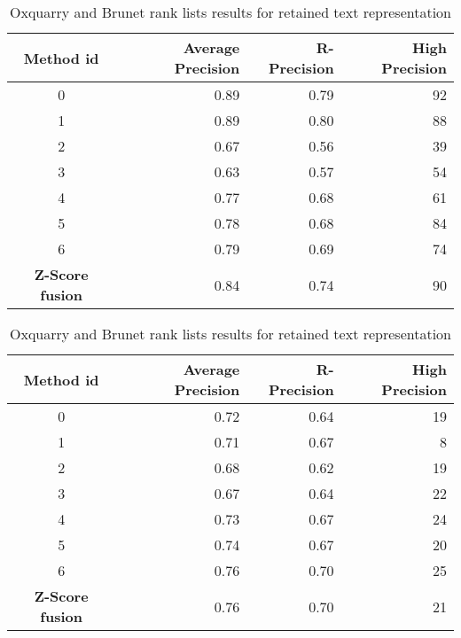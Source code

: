 \begin{table}[H]
  \centering
  \caption{Oxquarry and Brunet rank lists results for retained text representation}
  \label{tab:9rl_results_brunet_oxquarry}

  \begin{tabular}{c r r r}
    \toprule
    Method id &
    Average Precision &
    R-Precision &
    High Precision \\
    \midrule
    0 & 0.89 & 0.79 & 92 \\
    1 & 0.89 & 0.80 & 88 \\
    2 & 0.67 & 0.56 & 39 \\
    3 & 0.63 & 0.57 & 54 \\
    4 & 0.77 & 0.68 & 61 \\
    5 & 0.78 & 0.68 & 84 \\
    6 & 0.79 & 0.69 & 74 \\
    \textbf{Z-Score fusion} &  0.84 & 0.74 & 90 \\
    \bottomrule
  \end{tabular}

  \vspace{0.5cm}

  \begin{tabular}{c r r r}
    \toprule
    Method id &
    Average Precision &
    R-Precision &
    High Precision \\
    \midrule
    0 & 0.72 & 0.64 & 19 \\
    1 & 0.71 & 0.67 &  8 \\
    2 & 0.68 & 0.62 & 19 \\
    3 & 0.67 & 0.64 & 22 \\
    4 & 0.73 & 0.67 & 24 \\
    5 & 0.74 & 0.67 & 20 \\
    6 & 0.76 & 0.70 & 25 \\
    \textbf{Z-Score fusion} & 0.76 &  0.70 & 21 \\
    \bottomrule
  \end{tabular}

\end{table}


